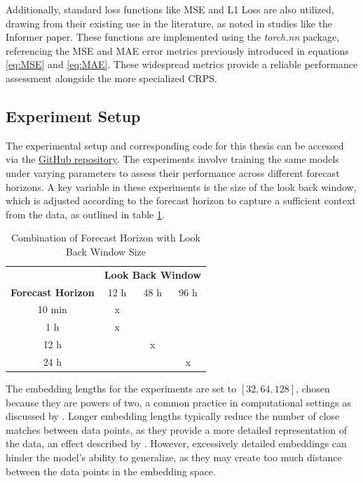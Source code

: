 \documentclass{article}
\begin{document}
Additionally, standard loss functions like MSE and L1 Loss are also utilized, drawing from their existing use in the literature, as noted in studies like the Informer paper. These functions are implemented using the \textit{torch.nn} package, referencing the MSE and MAE error metrics previously introduced in equations \ref{eq:MSE} and \ref{eq:MAE}. These widespread metrics provide a reliable performance assessment alongside the more specialized CRPS.


\subsection{Experiment Setup}

The experimental setup and corresponding code for this thesis can be accessed via the \href{https://github.com/janbesler/Masterarbeit}{GitHub repository}. The experiments involve training the same models under varying parameters to assess their performance across different forecast horizons. A key variable in these experiments is the size of the look back window, which is adjusted according to the forecast horizon to capture a sufficient context from the data, as outlined in table \ref{tab:forecast-lookback}.

\begin{table}[h!]
  \begin{center}
    \caption{Combination of Forecast Horizon with Look Back Window Size}
    \begin{tabular}{c|c|c|c}
      \toprule
       & \multicolumn{3}{c}{\textbf{Look Back Window}} \\
      \textbf{Forecast Horizon} & 12 h & 48 h & 96 h \\
      \midrule
      10 min & x & & \\
      1 h & x & & \\
      12 h & & x & \\
      24 h & & & x \\
      \bottomrule
    \end{tabular}
    \label{tab:forecast-lookback}
  \end{center}
\end{table}

The embedding lengths for the experiments are set to $[32, 64, 128]$, chosen because they are powers of two, a common practice in computational settings as discussed by \cite{optimal_embedding_length}. Longer embedding lengths typically reduce the number of close matches between data points, as they provide a more detailed representation of the data, an effect described by \cite{introduction_embeddings}. However, excessively detailed embeddings can hinder the model's ability to generalize, as they may create too much distance between the data points in the embedding space.
\end{document}
